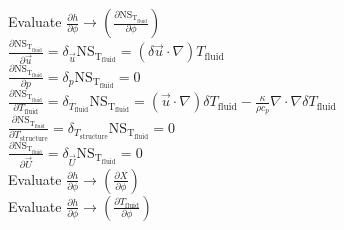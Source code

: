 \documentclass[10pt]{article} %
\begin{document}
\begin{center}
	Evaluate $\frac{\partial h}{\partial \phi} \rightarrow \left( \frac{\partial \text{NS}_{\text{T}_{\text{fluid}}}}{\partial \phi}\right)$\\
	$\frac{\partial \text{NS}_{\text{T}_{\text{fluid}}}}{\partial \vec{u}} = \delta_{\vec{u}} \text{NS}_{\text{T}_{\text{fluid}}} = \left(\delta \vec{u} \cdot \nabla\right)T_{\text{fluid}}$\\
	$\frac{\partial \text{NS}_{\text{T}_{\text{fluid}}}}{\partial p} = \delta_{p} \text{NS}_{\text{T}_{\text{fluid}}} = 0 $\\
	$\frac{\partial \text{NS}_{\text{T}_{\text{fluid}}}}{\partial T_{\text{fluid}}} = \delta_{T_{\text{fluid}}} \text{NS}_{\text{T}_{\text{fluid}}} = \left(\vec{u}\cdot \nabla\right)\delta T_{\text{fluid}} - \frac{\kappa}{\rho c_p}\nabla \cdot \nabla \delta T_{\text{fluid}}$\\
	$\frac{\partial \text{NS}_{\text{T}_{\text{fluid}}}}{\partial T_{\text{structure}}} = \delta_{T_{\text{structure}}} \text{NS}_{\text{T}_{\text{fluid}}} = 0$\\
	$\frac{\partial \text{NS}_{\text{T}_{\text{fluid}}}}{\partial \vec{U}} = \delta_{\vec{U}} \text{NS}_{\text{T}_{\text{fluid}}} = 0$\\$ $\\
	
	Evaluate $\frac{\partial h}{\partial \phi} \rightarrow \left( \frac{\partial X}{\partial \phi}\right)$\\$ $\\
	
	Evaluate $\frac{\partial h}{\partial \phi} \rightarrow \left( \frac{\partial T_{\text{fluid}}}{\partial \phi}\right)$\\$ $\\
	

\end{center}
\end{document}
